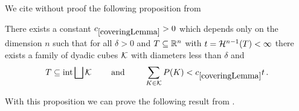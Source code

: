 We cite without proof the following proposition from \cite[Lemma 1.3.2]{Pfe2001}
\begin{proposition}\label{pr:coveringLemma}
There exists a constant $\useconstant{coveringLemma}>0$ which depends only on the dimension $n$ such that for all $\delta>0$ and $T\subseteq\mathbb{R}^n$ with $t=\mathcal{H}^{n-1}(T)<\infty$  there exists a family of dyadic cubes $\mathcal{K}$ with diameters less than $\delta$ and
\begin{align*}
	T\subseteq\interior\bigsqcup\cK \qquad\text{ and }\qquad\sum_{K\in\cK}P(K)<\useconstant{coveringLemma} t\,.
\end{align*}
\end{proposition}

\noindent With this proposition we can prove the following result from \cite[Lemma 2.6.4]{Pfe2001}.

